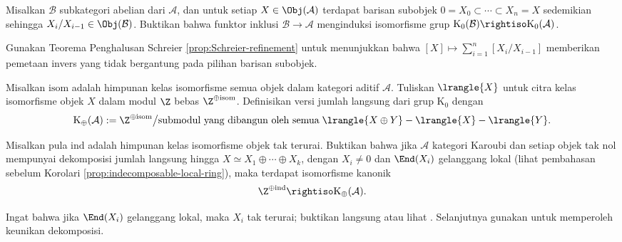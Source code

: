 \begin{Exercises}
	\item Misalkan $\mathcal{B}$ subkategori abelian dari $\mathcal{A}$, dan
	untuk setiap $X\in\Obj(\mathcal{A})$ terdapat barisan subobjek
	$0=X_0\subset\cdots\subset X_n=X$ sedemikian sehingga
	$X_i/X_{i-1}\in\Obj(\mathcal{B})$. Buktikan bahwa funktor inklusi
	$\mathcal{B}\to\mathcal{A}$ menginduksi isomorfisme grup
	$\mathrm{K}_0(\mathcal{B})\rightiso\mathrm{K}_0(\mathcal{A})$.

	\begin{hint}
		Gunakan Teorema Penghalusan Schreier
		\ref{prop:Schreier-refinement} untuk menunjukkan bahwa
		$[X]\mapsto\sum_{i=1}^n[X_i/X_{i-1}]$ memberikan pemetaan invers yang
		tidak bergantung pada pilihan barisan subobjek.
	\end{hint}

	\item Misalkan $\mathrm{isom}$ adalah himpunan kelas isomorfisme semua objek
	dalam kategori aditif $\mathcal{A}$. Tuliskan $\lrangle{X}$ untuk citra kelas
	isomorfisme objek $X$ dalam modul $\Z$ bebas
	$\Z^{\oplus\mathrm{isom}}$. Definisikan versi jumlah langsung dari grup
	$\mathrm{K}_0$ dengan
	\[ \mathrm{K}_{\oplus}(\mathcal{A}) := \Z^{\oplus \mathrm{isom}} \big/
	\text{submodul yang dibangun oleh semua}\;
	\lrangle{X \oplus Y} - \lrangle{X} - \lrangle{Y}. \]

	Misalkan pula $\mathrm{ind}$ adalah himpunan kelas isomorfisme objek tak
	terurai. Buktikan bahwa jika $\mathcal{A}$ kategori Karoubi dan setiap objek
	tak nol mempunyai dekomposisi jumlah langsung hingga
	$X\simeq X_1\oplus\cdots\oplus X_k$, dengan $X_i\neq0$ dan
	$\End(X_i)$ gelanggang lokal (lihat pembahasan sebelum Korolari
	\ref{prop:indecomposable-local-ring}), maka terdapat isomorfisme kanonik
	\[ \Z^{\oplus \mathrm{ind}} \rightiso \mathrm{K}_{\oplus}(\mathcal{A}). \]

	\begin{hint}
		Ingat bahwa jika $\End(X_i)$ gelanggang lokal, maka $X_i$
		tak terurai; buktikan langsung atau lihat \cite[Lema 6.12.6]{Li1}.
		Selanjutnya gunakan \cite[Teorema 6.12.8]{Li1} untuk memperoleh keunikan
		dekomposisi.
	\end{hint}


\end{Exercises}
